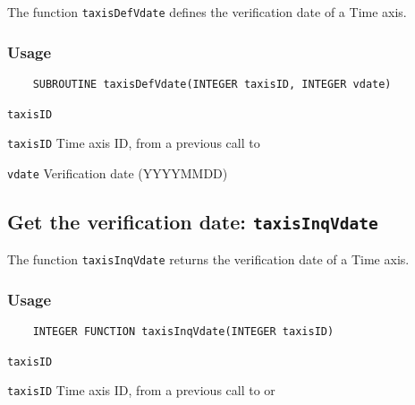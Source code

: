 The function {\texttt{taxisDefVdate}} defines the verification date of a Time axis.

\subsubsection*{Usage}

\begin{verbatim}
    SUBROUTINE taxisDefVdate(INTEGER taxisID, INTEGER vdate)
\end{verbatim}

\hspace*{4mm}\begin{minipage}[]{15cm}
\begin{deflist}{\texttt{taxisID}\ }
\item[\texttt{taxisID}]
Time axis ID, from a previous call to {}
\item[\texttt{vdate}]
Verification date (YYYYMMDD)

\end{deflist}
\end{minipage}


\subsection{Get the verification date: \texttt{taxisInqVdate}}
\label{taxisInqVdate}

The function {\texttt{taxisInqVdate}} returns the verification date of a Time axis.

\subsubsection*{Usage}

\begin{verbatim}
    INTEGER FUNCTION taxisInqVdate(INTEGER taxisID)
\end{verbatim}

\hspace*{4mm}\begin{minipage}[]{15cm}
\begin{deflist}{\texttt{taxisID}\ }
\item[\texttt{taxisID}]
Time axis ID, from a previous call to {} or {}

\end{deflist}
\end{minipage}

